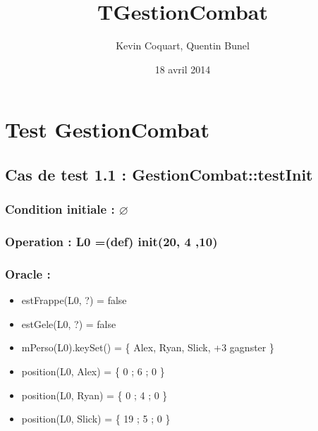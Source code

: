\documentclass[11pt]{article}
\title{TGestionCombat}
\author{Kevin Coquart, Quentin Bunel}
\date{18 avril 2014}
\begin{document}
\maketitle

\setcounter{tocdepth}{3}
\tableofcontents
\vspace*{1cm}
\section{Test GestionCombat}
\label{sec-1}


\subsection{Cas de test 1.1 : GestionCombat::testInit}
\label{sec-1.1}

\subsubsection{Condition initiale : $\varnothing$}
\label{sec-1.1.1}

\subsubsection{Operation : L0 =(def) init(20, 4 ,10)}
\label{sec-1.1.2}

\subsubsection{Oracle :}
\label{sec-1.1.3}

\begin{itemize}

\item estFrappe(L0, ?) = false\\
\label{sec-1.1.3.1}


\item estGele(L0, ?) = false\\
\label{sec-1.1.3.2}


\item mPerso(L0).keySet() = \{ Alex, Ryan, Slick, +3 gagnster \}\\
\label{sec-1.1.3.3}


\item position(L0, Alex) = \{ 0 ; 6 ; 0 \}\\
\label{sec-1.1.3.4}


\item position(L0, Ryan) = \{ 0 ; 4 ; 0 \}\\
\label{sec-1.1.3.5}


\item position(L0, Slick) = \{ 19 ; 5 ; 0 \}\\
\label{sec-1.1.3.6}





\end{itemize} %
\end{document}
